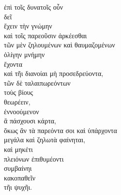
{\large
\begin{greek}
\noindent ἐπὶ τοῖς δυνατοῖς οὖν \\
δεῖ \\
\tabto{2em} ἔχειν τὴν γνώμην \\
\tabto{2em} καὶ τοῖς παρεοῦσιν ἀρκέεσθαι \\
\tabto{4em} τῶν μὲν ζηλουμένων καὶ θαυμαζομένων \\
\tabto{2em} ὀλίγην μνήμην \\
ἔχοντα\\
καὶ τῆι διανοίαι μὴ προσεδρεύοντα, \\
\tabto{4em} τῶν δὲ ταλαιπωρεόντων \\
\tabto{2em} τοὺς βίους \\
θεωρέειν, \\
ἐννοούμενον \\
\tabto{2em} ἃ πάσχουσι κάρτα, \\

\noindent ὅκως ἂν τὰ παρεόντα σοι καὶ ὑπάρχοντα \\
\tabto{2em} μεγάλα καὶ ζηλωτὰ φαίνηται, \\
\tabto{2em} καὶ μηκέτι \\
\tabto{2em} πλειόνων ἐπιθυμέοντι \\
\tabto{2em} συμβαίνηι \\
\tabto{4em} κακοπαθεῖν \\
\tabto{6em} τῆι ψυχῆι.\\

\end{greek}
}

